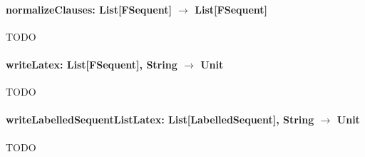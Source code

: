 \documentclass[a4paper, 11pt]{report}
\begin{document}
\paragraph{\textbf{normalizeClauses: List[FSequent] $\rightarrow$ List[FSequent]}}
{\color{red}TODO}

\paragraph{\textbf{writeLatex: List[FSequent], String $\rightarrow$ Unit}}
{\color{red}TODO}

\paragraph{\textbf{writeLabelledSequentListLatex: List[LabelledSequent], String $\rightarrow$ Unit}}
{\color{red}TODO}



\end{document}
